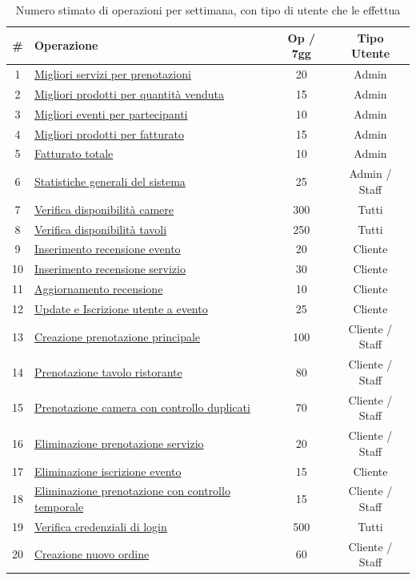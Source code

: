 \documentclass[a4paper,12pt]{report}
\begin{document}
\begin{table}[H]
  \centering
  \small
  \renewcommand{\arraystretch}{1.12}
  \begin{tabularx}{\textwidth}{|c|>{\raggedright\arraybackslash}X|c|c|}
    \hline
    \rowcolor{gray!20}
    \textbf{\#} & \textbf{Operazione} & \textbf{Op / 7gg} &
    \textbf{Tipo Utente} \\
    \hline
    1 & \hyperref[op1]{Migliori servizi per prenotazioni} & 20 & Admin \\
    \hline
    2 & \hyperref[op2]{Migliori prodotti per quantità venduta} & 15 & Admin \\
    \hline
    3 & \hyperref[op3]{Migliori eventi per partecipanti} & 10 & Admin \\
    \hline
    4 & \hyperref[op4]{Migliori prodotti per fatturato} & 15 & Admin \\
    \hline
    5 & \hyperref[op5]{Fatturato totale} & 10 & Admin \\
    \hline
    6 & \hyperref[op6]{Statistiche generali del sistema} & 25 & Admin / Staff \\
    \hline
    7 & \hyperref[op7]{Verifica disponibilità camere} & 300 & Tutti \\
    \hline
    8 & \hyperref[op8]{Verifica disponibilità tavoli} & 250 & Tutti \\
    \hline
    9 & \hyperref[op9]{Inserimento recensione evento} & 20 & Cliente \\
    \hline
    10 & \hyperref[op10]{Inserimento recensione servizio} & 30 & Cliente \\
    \hline
    11 & \hyperref[op11]{Aggiornamento recensione} & 10 & Cliente \\
    \hline
    12 & \hyperref[op12]{Update e Iscrizione utente a evento} & 25 & Cliente \\
    \hline
    13 & \hyperref[op13]{Creazione prenotazione principale} & 100 &
    Cliente / Staff \\
    \hline
    14 & \hyperref[op14]{Prenotazione tavolo ristorante} & 80 &
    Cliente / Staff \\
    \hline
    15 & \hyperref[op15]{Prenotazione camera con controllo duplicati}
    & 70 & Cliente / Staff \\
    \hline
    16 & \hyperref[op16]{Eliminazione prenotazione servizio} & 20 &
    Cliente / Staff \\
    \hline
    17 & \hyperref[op17]{Eliminazione iscrizione evento} & 15 & Cliente \\
    \hline
    18 & \hyperref[op18]{Eliminazione prenotazione con controllo
    temporale} & 15 & Cliente / Staff \\
    \hline
    19 & \hyperref[op19]{Verifica credenziali di login} & 500 & Tutti \\
    \hline
    20 & \hyperref[op20]{Creazione nuovo ordine} & 60 & Cliente / Staff \\
    \hline
  \end{tabularx}
  \caption{Numero stimato di operazioni per settimana, con tipo di
  utente che le effettua}
  \label{tab:operazioni-settimanali}
\end{table}
\end{document}
